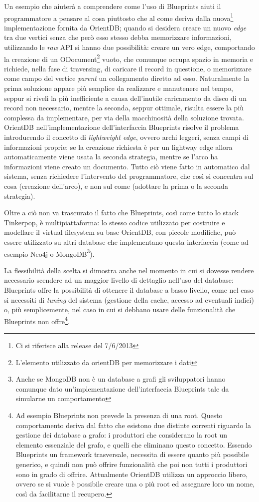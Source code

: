Un esempio che aiuterà a comprendere come l'uso di Blueprints aiuti il programmatore a pensare al cosa piuttosto che al come deriva dalla nuova\footnote{Ci si riferisce alla release del 7/6/2013} implementazione fornita da OrientDB; quando si desidera creare un nuovo \emph{edge} tra due vertici senza che però esso stesso debba memorizzare informazioni, utilizzando le \emph{raw} API si hanno due possibilità: creare un vero edge, comportando la creazione di un ODocument\footnote{L'elemento utilizzato da orientDB per memorizzare i dati} vuoto, che comunque occupa spazio in memoria e richiede, nella fase di traversing, di caricare il record in questione, o memorizzare come campo del vertice \emph{parent} un collegamento diretto ad esso. Naturalmente la prima soluzione appare più semplice da realizzare e manutenere nel tempo, seppur si riveli la più inefficiente a causa dell'inutile caricamento da disco di un record non necessario, mentre la seconda, seppur ottimale, risulta essere la più complessa da implementare, per via della macchinosità della soluzione trovata. OrientDB nell'implementazione dell'interfaccia Blueprints risolve il problema introducendo il concetto di \emph{lightweight edge}, ovvero archi leggeri, senza campi di informazioni proprie; se la creazione richiesta è per un lightway edge allora automaticamente viene usata la seconda strategia, mentre se l'arco ha informazioni viene creato un documento. Tutto ciò viene fatto in automatico dal sistema, senza richiedere l'intervento del programmatore, che così si concentra sul cosa (creazione dell'arco), e non sul come (adottare la prima o la seconda strategia).

Oltre a ciò non va trascurato il fatto che Blueprints, così come tutto lo stack Tinkerpop, è multipiattaforma: lo stesso codice utilizzato per costruire e modellare il virtual filesystem su base OrientDB, con piccole modifiche, può essere utilizzato su altri database che implementano questa interfaccia (come ad esempio Neo4j o MongoDB\footnote{Anche se MongoDB non è un database a grafi gli sviluppatori hanno comunque dato un'implementazione dell'interfaccia Blueprints tale da simularne un comportamento}).

La flessibilità della scelta si dimostra anche nel momento in cui si dovesse rendere necessario scendere ad un maggior livello di dettaglio nell'uso del database: Blueprints offre la possibilità di ottenere il database a basso livello, come nel caso si necessiti di \emph{tuning} del sistema (gestione della cache, accesso ad eventuali indici) o, più semplicemente, nel caso in cui si debbano usare delle funzionalità che Blueprints non offre\footnote{Ad esempio Blueprints non prevede la presenza di una root. Questo comportamento deriva dal fatto che esistono due distinte correnti riguardo la gestione dei database a grafo: i produttori che considerano la root un elemento essenziale del grafo, e quelli che eliminano questo concetto. Essendo Blueprints un framework trasversale, necessita di essere quanto più possibile generico, e quindi non può offrire funzionalità che poi non tutti i produttori sono in grado di offrire. Attualmente OrientDB utilizza un approccio libero, ovvero se si vuole è possibile creare una o più root ed assegnare loro un nome, così da facilitarne il recupero.}.

